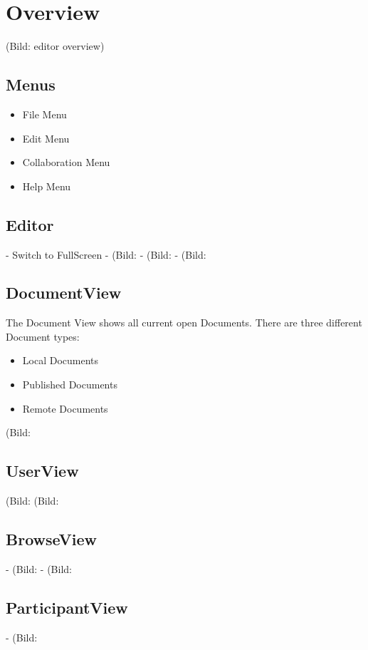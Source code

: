 \documentclass[11pt,a4paper]{article}
\begin{document}
\newpage
\section{Overview}
(Bild: editor overview)

\subsection{Menus}
\begin{itemize}
\item File Menu
\item Edit Menu
\item Collaboration Menu
\item Help Menu
\end{itemize}

\subsection{Editor}
- Switch to FullScreen
- (Bild: %
- (Bild: %
- (Bild: %

\subsection{DocumentView}
The Document View shows all current open Documents. There are three different Document types:
\begin{itemize}
\item Local Documents
\item Published Documents
\item Remote Documents
\end{itemize}

(Bild: %

\subsection{UserView}
(Bild: %
(Bild: %

\subsection{BrowseView}
- (Bild: %
- (Bild: %

\subsection{ParticipantView}
- (Bild: %
\end{document}
